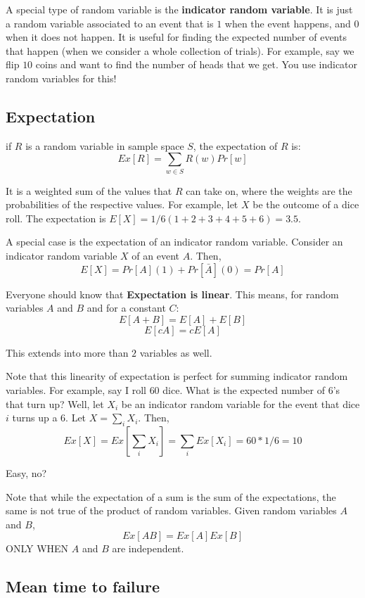 \documentclass[11pt]{article}
\begin{document}
	A special type of random variable is the \textbf{indicator random variable}.  It is
	just a random variable associated to an event that is $1$ when the event happens, 
	and $0$ when it does not happen.  It is useful for finding the expected number
	of events that happen (when we consider a whole collection of trials).  For
	example, say we flip $10$ coins and want to find the number of heads that we get.
	You use indicator random variables for this!  
	
	\subsection{Expectation}
	
	if $R$ is a random variable in sample space $S$, the expectation of $R$ is:
	$$Ex[R] = \sum_{w \in S} R(w) Pr[w]$$
	
	It is a weighted sum of the values that $R$ can take on, where the weights are
	the probabilities of the respective values.  For example, let $X$ be the
	outcome of a dice roll.  The expectation is
	$E[X] = 1/6(1 + 2 + 3 + 4 + 5 + 6) = 3.5$.
	
	A special case is the expectation of an indicator random variable.  Consider an 
	indicator random variable $X$ of an event $A$.  Then,
	$$E[X] = Pr[A](1) + Pr[\bar{A}](0) = Pr[A]$$
	
	
	Everyone should know that \textbf{Expectation is linear}.  This means, for random
	variables $A$ and $B$ and for a constant $C$:
	$$E[A + B] = E[A] + E[B]$$
	$$E[cA] = cE[A]$$
	
	This extends into more than $2$ variables as well.

	Note that this linearity of expectation is perfect for summing indicator random variables. For example, say I roll $60$ dice.  What is the expected number of $6$'s that
	turn up?  Well, let $X_i$ be an indicator random variable for the event that dice
	$i$ turns up a $6$.  Let $X = \sum_i X_i$.  Then, 
	$$Ex[X] = Ex[\sum_i X_i] = \sum_i Ex[X_i] = 60*1/6 = 10$$
	
	Easy, no?

	Note that while the expectation of a sum is the sum of the expectations, the same
	is not true of the product of random variables.  Given random variables $A$ and $B$,
	$$Ex[AB] = Ex[A] Ex[B]$$
	ONLY WHEN $A$ and $B$ are independent.  

	\subsection{Mean time to failure}
	
\end{document}
